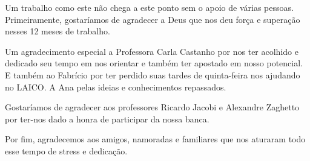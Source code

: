 \begin{agradecimentos}
	
	Um trabalho como este não chega a este ponto sem o apoio de várias pessoas. Primeiramente, gostaríamos de agradecer a Deus que nos deu força e superação nesses 12 meses de trabalho.

	Um agradecimento especial a Professora Carla Castanho por nos ter acolhido e dedicado seu tempo em nos orientar e também ter apostado em nosso potencial. E também ao Fabrício por ter perdido suas tardes de quinta-feira nos ajudando no LAICO. A Ana pelas ideias e conhecimentos repassados.

	Gostaríamos de agradecer aos professores Ricardo Jacobi e Alexandre Zaghetto por ter-nos dado a honra de participar da nossa banca.

	Por fim, agradecemos aos amigos, namoradas e familiares que nos aturaram todo esse tempo de stress e dedicação.

\end{agradecimentos}